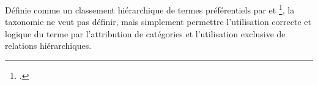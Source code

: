 Définie comme un \og classement hiérarchique de termes préférentiels\fg{} par  et \footcite{rosenfeld_information_2015}, la taxonomie ne veut pas définir, mais simplement permettre l'utilisation correcte et logique du terme par l'attribution de catégories et l'utilisation exclusive de relations hiérarchiques.\\



